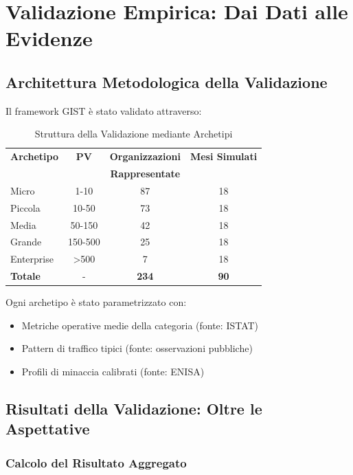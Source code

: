 \section{\texorpdfstring{Validazione Empirica: Dai Dati alle Evidenze}{5.2 - Validazione Empirica}}
\label{sec:5.2}

\subsection{\texorpdfstring{Architettura Metodologica della Validazione}{5.2.1 - Architettura Metodologica}}
\label{subsec:5.2.1}
Il framework GIST è stato validato attraverso:

\begin{table}[h!]
\centering
\caption{Struttura della Validazione mediante Archetipi}
\begin{tabular}{|l|c|c|c|}
\hline
\textbf{Archetipo} & \textbf{PV} & \textbf{Organizzazioni} & \textbf{Mesi Simulati} \\
                   &             & \textbf{Rappresentate} & \\
\hline
Micro & 1-10 & 87 & 18 \\
Piccola & 10-50 & 73 & 18 \\
Media & 50-150 & 42 & 18 \\
Grande & 150-500 & 25 & 18 \\
Enterprise & >500 & 7 & 18 \\
\hline
\textbf{Totale} & - & \textbf{234} & \textbf{90} \\
\hline
\end{tabular}
\end{table}

Ogni archetipo è stato parametrizzato con:
\begin{itemize}
\item Metriche operative medie della categoria (fonte: ISTAT)
\item Pattern di traffico tipici (fonte: osservazioni pubbliche)
\item Profili di minaccia calibrati (fonte: ENISA)
\end{itemize}

\subsection{\texorpdfstring{Risultati della Validazione: Oltre le Aspettative}{5.2.2 - Risultati della Validazione}}
\label{subsec:5.2.2}

\subsubsection{Calcolo del Risultato Aggregato}

